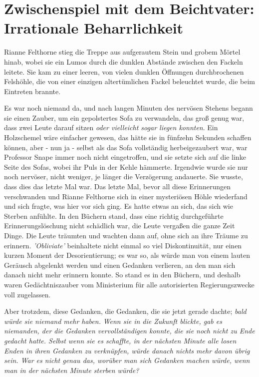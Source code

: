 \chapter{Zwischenspiel mit dem Beichtvater: Irrationale Beharrlichkeit}

Rianne Felthorne stieg die Treppe aus aufgerautem Stein und grobem Mörtel hinab,
wobei sie ein Lumos durch die dunklen Abstände zwischen den Fackeln leitete. Sie
kam zu einer leeren, von vielen dunklen Öffnungen durchbrochenen Felshöhle, die
von einer einzigen altertümlichen Fackel beleuchtet wurde, die beim Eintreten
brannte.

Es war noch niemand da, und nach langen Minuten des nervösen Stehens begann sie
einen Zauber, um ein gepolstertes Sofa zu verwandeln, das groß genug war, dass
zwei Leute darauf sitzen \emph{oder vielleicht sogar liegen konnten}. Ein
Holzschemel wäre einfacher gewesen, das hätte sie in fünfzehn Sekunden schaffen
können, aber - nun ja - selbst als das Sofa vollständig herbeigezaubert war, war
Professor Snape immer noch nicht eingetroffen, und sie setzte sich auf die linke
Seite des Sofas, wobei ihr Puls in der Kehle hämmerte. Irgendwie wurde sie nur
noch nervöser, nicht weniger, je länger die Verzögerung andauerte. Sie wusste,
dass dies das letzte Mal war. Das letzte Mal, bevor all diese Erinnerungen
verschwanden und Rianne Felthorne sich in einer mysteriösen Höhle wiederfand und
sich fragte, was hier vor sich ging. Es hatte etwas an sich, das sich wie
Sterben anfühlte. In den Büchern stand, dass eine richtig durchgeführte
Erinnerungslöschung nicht schädlich war, die Leute vergaßen die ganze Zeit
Dinge. Die Leute träumten und wachten dann auf, ohne sich an ihre Träume zu
erinnern. \emph{'Obliviate'} beinhaltete nicht einmal so viel Diskontinuität,
nur einen kurzen Moment der Desorientierung; es war so, als würde man von einem
lauten Geräusch abgelenkt werden und einen Gedanken verlieren, an den man sich
danach nicht mehr erinnern konnte. So stand es in den Büchern, und deshalb waren
Gedächtniszauber vom Ministerium für alle autorisierten Regierungszwecke voll
zugelassen.

Aber trotzdem, diese Gedanken, die Gedanken, die sie jetzt gerade dachte;
\emph{bald würde sie niemand mehr haben.} \emph{Wenn sie in die Zukunft blickte,
gab es niemanden, der die Gedanken vervollständigen konnte, die sie noch nicht
zu Ende gedacht hatte. Selbst wenn sie es schaffte, in der nächsten Minute alle
losen Enden in ihren Gedanken zu verknüpfen, würde danach nichts mehr davon
übrig sein. War es nicht genau das, worüber man sich Gedanken machen würde, wenn
man in der nächsten Minute sterben würde?}

